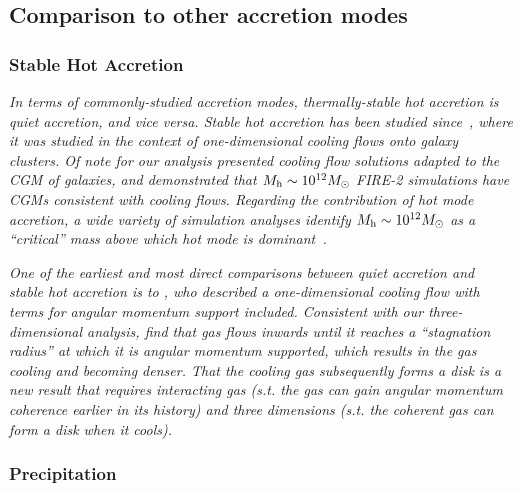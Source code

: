 \documentclass[fleqn,usenatbib]{mnras}
\begin{document}
\subsection{Comparison to other accretion modes}
\label{s: other modes}

\subsubsection{Stable Hot Accretion}

\textit{
In terms of commonly-studied accretion modes, thermally-stable hot accretion is quiet accretion, and vice versa.
Stable hot accretion has been studied since~\cite{Cowie1977a}, where it was studied in the context of one-dimensional cooling flows onto galaxy clusters.
Of note for our analysis \cite{Stern2019} presented cooling flow solutions adapted to the CGM of galaxies, and \cite{Stern2020} demonstrated that $M_{\rm h} \sim 10^{12} M_\odot$ FIRE-2 simulations have CGMs consistent with cooling flows.
Regarding the contribution of hot mode accretion, a wide variety of simulation analyses identify $M_{\rm h} \sim 10^{12} M_\odot$ as a ``critical'' mass above which hot mode is dominant~\citep[e.g.][, and many others]{Correa2017, Stern2020}.
}

\textit{
One of the earliest and most direct comparisons between quiet accretion and stable hot accretion is to \cite{Cowie1980}, who described a one-dimensional cooling flow with terms for angular momentum support included.
Consistent with our three-dimensional analysis, \citeauthor{Cowie1980} find that gas flows inwards until it reaches a ``stagnation radius'' at which it is angular momentum supported, which results in the gas cooling and becoming denser.
That the cooling gas subsequently forms a disk is a new result that requires interacting gas (s.t. the gas can gain angular momentum coherence earlier in its history) and three dimensions (s.t. the coherent gas can form a disk when it cools).
}

\subsubsection{Precipitation}
\end{document}
